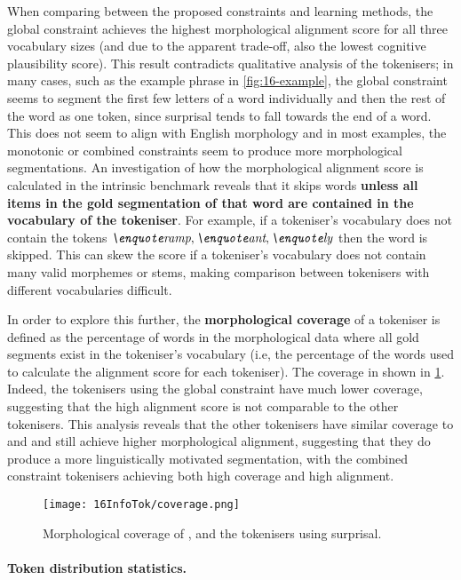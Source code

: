 When comparing between the proposed constraints and learning methods, the global constraint achieves the highest morphological alignment score for all three vocabulary sizes (and due to the apparent trade-off, also the lowest cognitive plausibility score). This result contradicts qualitative analysis of the tokenisers; in many cases, such as the example phrase in \cref{fig:16-example}, the global constraint seems to segment the first few letters of a word individually and then the rest of the word as one token, since surprisal tends to fall towards the end of a word. This does not seem to align with English morphology and in most examples, the monotonic or combined constraints seem to produce more morphological segmentations. An investigation of how the morphological alignment score is calculated in the intrinsic benchmark reveals that it skips words \textbf{unless all items in the gold segmentation of that word are contained in the vocabulary of the tokeniser}. For example, if a tokeniser's vocabulary does not contain the tokens \(\ex{ramp}, \ex{ant}, \ex{ly}\) then the word  is skipped. This can skew the score if a tokeniser's vocabulary does not contain many valid morphemes or stems, making comparison between tokenisers with different vocabularies difficult.

In order to explore this further, the \textbf{morphological coverage} of a tokeniser is defined as the percentage of words in the morphological data where all gold segments exist in the tokeniser's vocabulary (i.e, the percentage of the words used to calculate the alignment score for each tokeniser). The coverage in shown in \cref{fig:16-coverage}. Indeed, the tokenisers using the global constraint have much lower coverage, suggesting that the high alignment score is not comparable to the other tokenisers. This analysis reveals that the other \tokname tokenisers have similar coverage to \bpe and \bpewp and still achieve higher morphological alignment, suggesting that they do produce a more linguistically motivated segmentation, with the combined constraint tokenisers achieving both high coverage and high alignment. 

\begin{figure}[!t]
    \centering
    \texttt{[image: 16InfoTok/coverage.png]}
    \caption{Morphological coverage of \bpe, \bpewp and the \tokname tokenisers using surprisal.}
    \label{fig:16-coverage}
\end{figure}

\paragraph{Token distribution statistics.}

